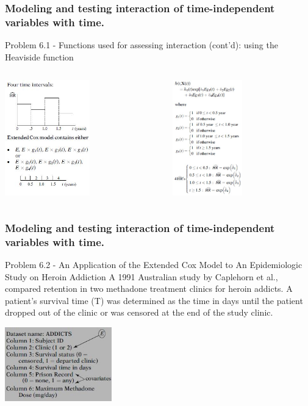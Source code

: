 \documentclass{beamer}
\theoremstyle{definition}
\begin{document}
\begin{frame}
\frametitle{Modeling and testing interaction of time-independent variables with time.}
\begin{block}{Problem 6.1 - Functions used for assessing interaction (cont'd): using the Heaviside function}
\begin{columns}
    \begin{column}{0.48\textwidth}
        \includegraphics[width =\textwidth, height=5cm]{CH6_fhev.JPG}
    \end{column}
    \hspace{-10pt}
    \begin{column}{0.48\textwidth}
         \includegraphics[width =\textwidth, height=5cm]{CH6_fhev2.JPG}
    \end{column}
\end{columns}
\end{block}
\end{frame}

\begin{frame}
\frametitle{Modeling and testing interaction of time-independent variables with time.}
\begin{block}{Problem 6.2 - An Application of the Extended Cox Model to An Epidemiologic Study on Heroin
Addiction}
A 1991 Australian study by Caplehorn et al., compared retention in two methadone treatment clinics for heroin addicts. A patient’s survival time (T) was determined as the time in days until the patient dropped out of the clinic or was censored at the end of the study clinic.
\vspace{-10pt}
\begin{center}
\includegraphics[height=3.2cm]{CH6_Heroin1.JPG}
\end{center}
\end{block}
\end{frame}
\end{document}
